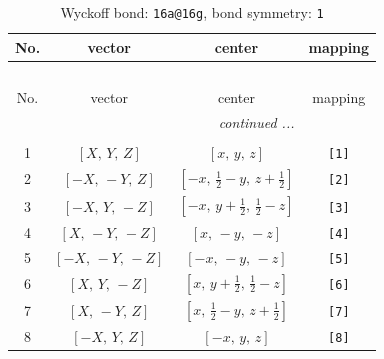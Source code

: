 \documentclass[fleqn,8pt]{jsarticle}
\begin{document}
\begin{longtable}{cccc}
\caption{Wyckoff bond: {\tt 16a@16g}, bond symmetry: {\tt 1}}
 \\
 \hline \hline
No. & vector & center & mapping \\ \hline \endfirsthead

\multicolumn{3}{l}{\tablename\ \thetable{}} \\
 \hline \hline
No. & vector & center & mapping \\ \hline \endhead

 \hline \hline
\multicolumn{3}{r}{\footnotesize\it continued ...} \\ \endfoot

 \hline \hline
\multicolumn{3}{r}{} \\ \endlastfoot

1 & $\left[ X,\, Y,\, Z \right]$ & $\left[ x,\, y,\, z \right]$ & {\tt [1]} \\ \hline
2 & $\left[ - X,\, - Y,\, Z \right]$ & $\left[ - x,\, \frac{1}{2} - y,\, z + \frac{1}{2} \right]$ & {\tt [2]} \\ \hline
3 & $\left[ - X,\, Y,\, - Z \right]$ & $\left[ - x,\, y + \frac{1}{2},\, \frac{1}{2} - z \right]$ & {\tt [3]} \\ \hline
4 & $\left[ X,\, - Y,\, - Z \right]$ & $\left[ x,\, - y,\, - z \right]$ & {\tt [4]} \\ \hline
5 & $\left[ - X,\, - Y,\, - Z \right]$ & $\left[ - x,\, - y,\, - z \right]$ & {\tt [5]} \\ \hline
6 & $\left[ X,\, Y,\, - Z \right]$ & $\left[ x,\, y + \frac{1}{2},\, \frac{1}{2} - z \right]$ & {\tt [6]} \\ \hline
7 & $\left[ X,\, - Y,\, Z \right]$ & $\left[ x,\, \frac{1}{2} - y,\, z + \frac{1}{2} \right]$ & {\tt [7]} \\ \hline
8 & $\left[ - X,\, Y,\, Z \right]$ & $\left[ - x,\, y,\, z \right]$ & {\tt [8]} \\
\end{longtable}
\end{document}
